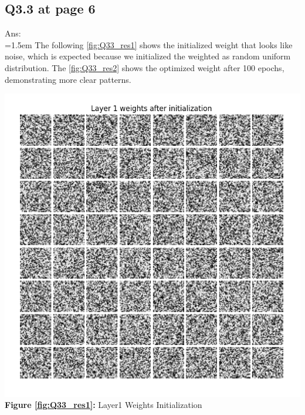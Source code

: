 \documentclass{article}
\begin{document}
	\newpage
	\subsection*{Q3.3 at page 6}
	Ans:\\
	\hangindent=1.5em \hspace{1.5em}The following \autoref{fig:Q33_res1} shows the initialized weight that looks like noise, which is expected because we initialized the weighted as random uniform distribution. The \autoref{fig:Q33_res2} shows the optimized weight after 100 epochs, demonstrating more clear patterns.


	\begin{minipage}{0.48\linewidth}
	\centering
	\includegraphics[width=\linewidth]{./Q33_res1.png}
	\textbf{Figure \ref{fig:Q33_res1}:} Layer1 Weights Initialization %
	\label{fig:Q33_res1}         %
	\end{minipage}
	\hfill
\end{document}

